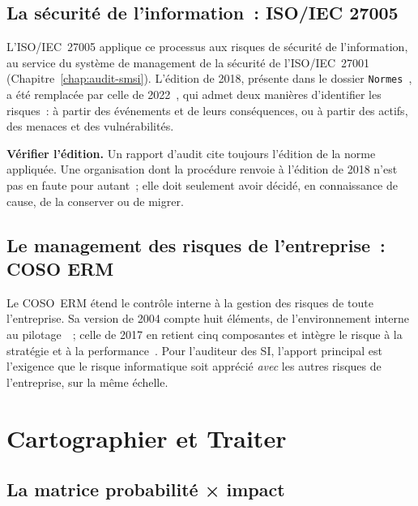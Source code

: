 \subsection{La sécurité de l'information~: ISO/IEC 27005}

L'ISO/IEC~27005 applique ce processus aux risques de sécurité de
l'information, au service du système de management de la sécurité de
l'ISO/IEC~27001 (Chapitre~\ref{chap:audit-smsi}). L'édition de 2018,
présente dans le dossier \texttt{Normes}~\cite{iso27005_2018}, a été
remplacée par celle de 2022~\cite{iso27005_2022}, qui admet deux manières
d'identifier les risques~: à partir des événements et de leurs
conséquences, ou à partir des actifs, des menaces et des vulnérabilités.

\begin{boxinfo}
\textbf{Vérifier l'édition.} Un rapport d'audit cite toujours l'édition de
la norme appliquée. Une organisation dont la procédure renvoie à
l'édition de 2018 n'est pas en faute pour autant~; elle doit seulement
avoir décidé, en connaissance de cause, de la conserver ou de migrer.
\end{boxinfo}

\subsection{Le management des risques de l'entreprise~: COSO ERM}

Le COSO~ERM étend le contrôle interne à la gestion des risques de toute
l'entreprise. Sa version de 2004 compte huit éléments, de l'environnement
interne au pilotage~\cite{coso2004ermfr}~; celle de 2017 en retient cinq
composantes et intègre le risque à la stratégie et à la
performance~\cite{coso2017erm}. Pour l'auditeur des SI, l'apport principal
est l'exigence que le risque informatique soit apprécié \emph{avec} les
autres risques de l'entreprise, sur la même échelle.

\section{Cartographier et Traiter}
\label{sec:c05-carto}

\subsection{La matrice probabilité × impact}

